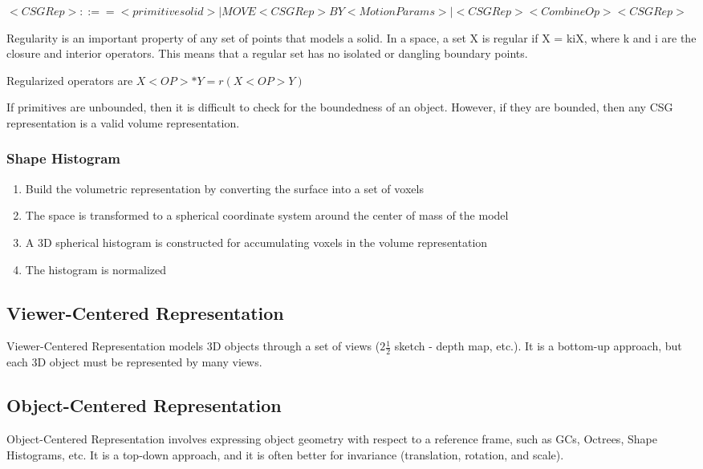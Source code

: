 \documentclass{article}
\begin{document}
\begin{multicols}{2}
$<CSG Rep> ::== <primitive solid> | MOVE <CSG Rep> BY <Motion Params> | <CSG Rep> <Combine Op> <CSG Rep>$

Regularity is an important property of any set of points that models a solid. In a space, a set X is regular if X = kiX, where k and i are the closure and interior operators. This means that a regular set has no isolated or dangling boundary points.

Regularized operators are
$X <OP> * Y =  r(X <OP> Y)$

If primitives are unbounded, then it is difficult to check for the boundedness of an object. However, if they are bounded, then any CSG representation is a valid volume representation.

\subsubsection{Shape Histogram}

\begin{enumerate}
  \item {Build the volumetric representation by converting the surface into a set of voxels}
  \item {The space is transformed to a spherical coordinate system around the center of mass of the model}
  \item {A 3D spherical histogram is constructed for accumulating voxels in the volume representation}
  \item {The histogram is normalized}
\end{enumerate}

\subsection{Viewer-Centered Representation}

Viewer-Centered Representation models 3D objects through a set of views ($2 \frac{1}{2}$ sketch - depth map, etc.). It is a bottom-up approach, but each 3D object must be represented by many views.

\subsection{Object-Centered Representation}

Object-Centered Representation involves expressing object geometry with respect to a reference frame, such as GCs, Octrees, Shape Histograms, etc. It is a top-down approach, and it is often better for invariance (translation, rotation, and scale).

\end{multicols}
\end{document}
